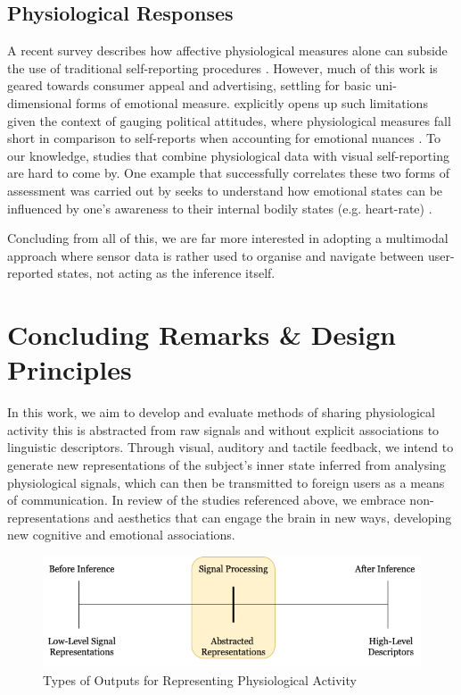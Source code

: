 \subsection{Physiological Responses}
A recent survey describes how affective physiological measures alone can subside the use of traditional self-reporting procedures \cite{barker_self-report_2016}. However, much of this work is geared towards consumer appeal and advertising, settling for basic uni-dimensional forms of emotional measure. \citeauthor{ciuk_measuring_2015} explicitly opens up such limitations given the context of gauging political attitudes, where physiological measures fall short in comparison to self-reports when accounting for emotional nuances \cite{ciuk_measuring_2015}. To our knowledge, studies that combine physiological data with visual self-reporting are hard to come by. One example that successfully correlates these two forms of assessment was carried out by \citeauthor{jung_role_2017} seeks to understand how emotional states can be influenced by one's awareness to their internal bodily states (e.g. heart-rate) \cite{jung_role_2017}.

Concluding from all of this, we are far more interested in adopting a multimodal approach where sensor data is rather used to organise and navigate between user-reported states, not acting as the inference itself.


\section{Concluding Remarks \& Design Principles}
\label{lit_review:conclusion}

In this work, we aim to develop and evaluate methods of sharing physiological activity this is abstracted from raw signals and without explicit associations to linguistic descriptors. Through visual, auditory and tactile feedback, we intend to generate new representations of the subject's inner state inferred from analysing physiological signals, which can then be transmitted to foreign users as a means of communication. In review of the studies referenced above, we embrace non-representations and aesthetics that can engage the brain in new ways, developing new cognitive and emotional associations.

\begin{figure}[htbp]
	\centering
	\includegraphics[width=1.0\textwidth]{Chapters/Figures/Abstracted_Representations.png}
	\caption{Types of Outputs for Representing Physiological Activity}
	\label{fig:Abstracted_Representations}
\end{figure}

